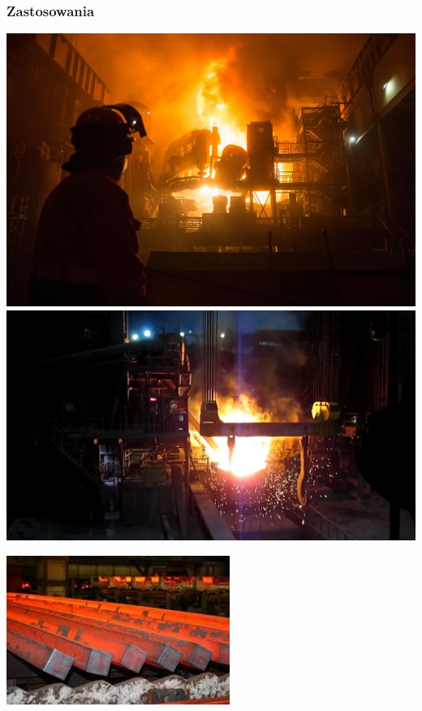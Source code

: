 \documentclass{beamer}
\begin{document}
\begin{frame}\frametitle{Zastosowania}
\begin{center}
\includegraphics[scale=0.145]{a}
\includegraphics[scale=0.12]{b}
\end{center}
\begin{center}
\includegraphics[scale=0.5]{c}
\end{center}
\end{frame}
\end{document}
